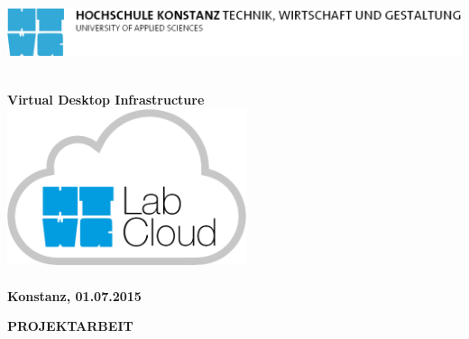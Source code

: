\begin{titlepage}

\vspace*{-3.5cm}

\begin{flushleft}
\hspace*{-1cm} \includegraphics[width=15.7cm]{include/htwg-logo.pdf}
\end{flushleft}

\vspace{2cm}

\begin{center}
	\huge{
		\textbf{\thema} \\[0.3cm]
	}
	\large{
		\textbf{Virtual Desktop Infrastructure} \\[2cm]
	}
	\includegraphics[width=7cm]{img/logo.png} \\[2cm]
	\Large{
		\textbf{\studiengang}
	}\\[1cm]
	\large{
		\textbf{Konstanz, 01.07.2015} \\[2.5cm]
	}
	
	\Huge{
		\textbf{{\sf PROJEKTARBEIT}}
	}
\end{center}

\end{titlepage}